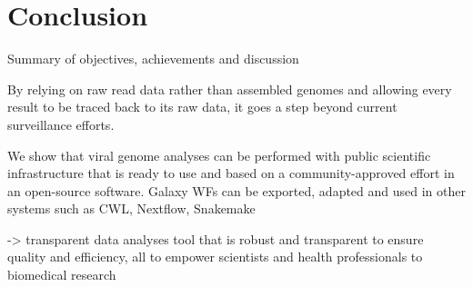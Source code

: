 \chapter{Conclusion}\label{chap:conclusion}
\todoit
Summary of objectives, achievements and discussion

By relying on raw read data rather than assembled genomes and allowing every result to be traced back to its raw data, it goes a step beyond current surveillance efforts.

We show that viral genome analyses can be performed with public scientific infrastructure that is ready to use and based on a community-approved effort in an open-source software.
Galaxy WFs can be exported, adapted and used in other systems such as CWL, Nextflow, Snakemake

-> transparent data analyses tool that is robust and transparent to ensure quality and efficiency, all to empower scientists and health professionals to biomedical research
